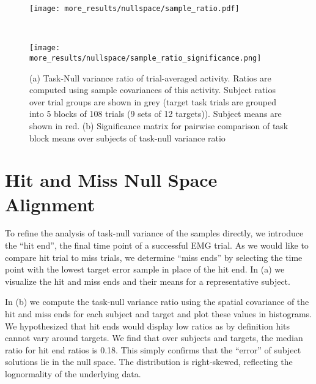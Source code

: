 \documentclass[../main.tex]{subfiles}
\begin{document}
  \begin{figure}[H]%
    \begin{minipage}{\textwidth}
      \centering
      \texttt{[image: more\_results/nullspace/sample\_ratio.pdf]}
      \subcaption{}
    \end{minipage}\\%
    \begin{minipage}{\textwidth}
      \centering
      \texttt{[image: more\_results/nullspace/sample\_ratio\_significance.png]}
      \subcaption{}
    \end{minipage}%
    \caption[Task-Null variance projections of activity error]{(a) Task-Null variance ratio of trial-averaged activity. Ratios are computed using sample covariances of this activity. Subject ratios over trial groups are shown in grey (target task trials are grouped into 5 blocks of 108 trials (9 sets of 12 targets)). Subject means are shown in red. (b) Significance matrix for pairwise comparison of task block means over subjects of task-null variance ratio}\label{fig:sample_ratio}
  \end{figure}






  \section{Hit and Miss Null Space Alignment}
    
  To refine the analysis of task-null variance of the samples directly, we introduce the ``hit end'', the final time point of a successful EMG trial. As we would like to compare hit trial to miss trials, we determine ``miss ends'' by selecting the time point with the lowest target error sample in place of the hit end. In  (a) we visualize the hit and miss ends and their means for a representative subject. 
  
  In  (b) we compute the task-null variance ratio using the spatial covariance of the hit and miss ends for each subject and target and plot these values in histograms. We hypothesized that hit ends would display low ratios as by definition hits cannot vary around targets. We find that over subjects and targets, the median ratio for hit end ratios is 0.18. This simply confirms that the ``error'' of subject solutions lie in the null space. The distribution is right-skewed, reflecting the lognormality of the underlying data.
  
\end{document}
